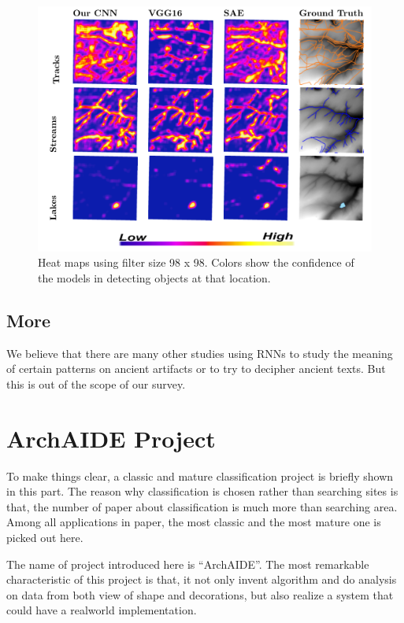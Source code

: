 \documentclass[journal]{IEEEtran}
\begin{document}
	  \begin{figure}[htbp]
		\centering
		\includegraphics[width=1.0\linewidth]{./picture/fig8.png}
		\caption{Heat maps using filter size 98 x 98. Colors show the confidence of the models in detecting
		objects at that location.}
	  \end{figure}

	\subsection{More}

	We believe that there are many other studies using RNNs to study the meaning of certain patterns on ancient artifacts or to try to decipher ancient texts.
	But this is out of the scope of our survey.
	
	\section{ArchAIDE Project}\label{example}
	
	To make things clear, a classic and mature classification project is briefly shown in this part. The reason why classification is chosen rather than searching sites is that, the number of paper about classification is much more than searching area. Among all applications in paper, the most classic and the most mature one is picked out here. 
	
	The name of project introduced here is ``ArchAIDE''. The most remarkable characteristic of this project is that, it not only invent algorithm and do analysis on data from both view of shape and decorations, but also realize a system that could have a realworld implementation. 
	
\end{document}

